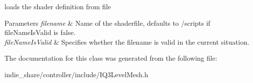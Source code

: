 loads the shader definition from file 


\begin{DoxyParams}{Parameters}
{\em filename} & Name of the shaderfile, defaults to /scripts if file\+Name\+Is\+Valid is false. \\
\hline
{\em file\+Name\+Is\+Valid} & Specifies whether the filename is valid in the current situation. \\
\hline
\end{DoxyParams}


The documentation for this class was generated from the following file\+:\begin{DoxyCompactItemize}
\item 
indie\+\_\+share/controller/include/I\+Q3\+Level\+Mesh.\+h\end{DoxyCompactItemize}
